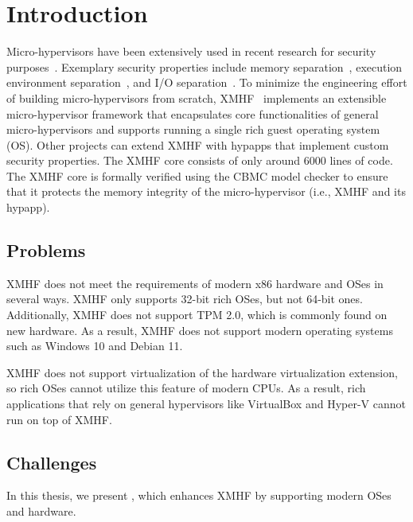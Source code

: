 \chapter{Introduction}
\label{sec:introduction}

Micro-hypervisors have been extensively used in recent research for security purposes~\cite{mccune2010trustvisor, vasudevan2012lockdown, steinberg2010nova, zhou2014dancing, zhou2012building, yu2015trusted, cui2018securing}. Exemplary security properties include memory separation~\cite{mccune2010trustvisor}, execution environment separation~\cite{vasudevan2012lockdown, steinberg2010nova}, and I/O separation~\cite{zhou2012building, zhou2014dancing, yu2015trusted, cui2018securing}. To minimize the engineering effort of building micro-hypervisors from scratch, XMHF~\cite{vasudevan2013design} implements an extensible micro-hypervisor framework that encapsulates core functionalities of general micro-hypervisors and supports running a single rich guest operating system (OS). Other projects can extend XMHF with hypapps that implement custom security properties. The XMHF core consists of only around 6000 lines of code. The XMHF core is formally verified using the CBMC model checker to ensure that it protects the memory integrity of the micro-hypervisor (i.e., XMHF and its hypapp).

\section{Problems}

XMHF does not meet the requirements of modern x86 hardware and OSes in several ways. XMHF only supports 32-bit rich OSes, but not 64-bit ones. Additionally, XMHF does not support TPM 2.0, which is commonly found on new hardware. As a result, XMHF does not support modern operating systems such as Windows 10 and Debian 11.

XMHF does not support virtualization of the hardware virtualization extension, so rich OSes cannot utilize this feature of modern CPUs. As a result, rich applications that rely on general hypervisors like VirtualBox and Hyper-V cannot run on top of XMHF.

\section{Challenges}

In this thesis, we present , which enhances XMHF by supporting modern OSes and hardware.

